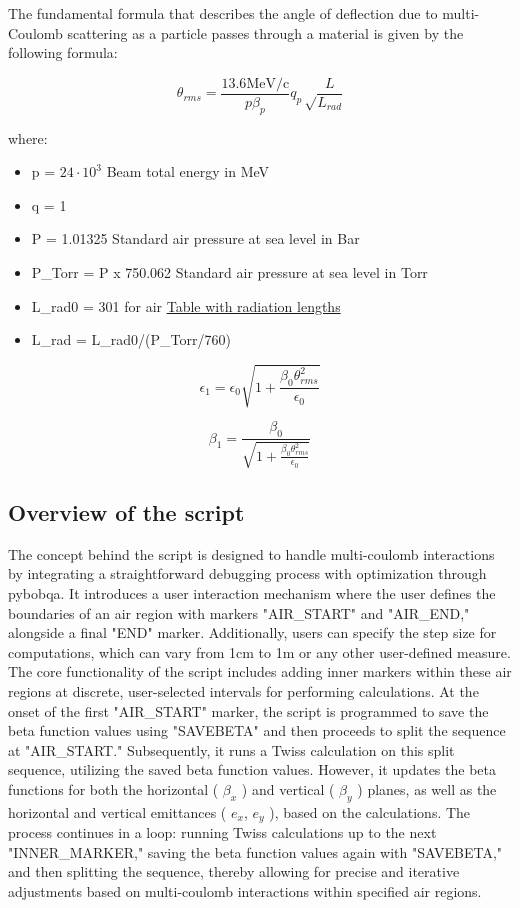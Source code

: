\documentclass[a4paper,
               biblatex,     %
               ]{jacow}
\begin{document}
The fundamental formula that describes the angle of deflection due to multi-Coulomb scattering as a particle passes through a material is given by the following formula:

\[
\theta_{rms} = \frac{13.6 \text{MeV/c}}{p\beta_{p}}q_{p}\sqrt\frac{L}{L_{rad}}\]

where:
\begin{itemize}
\item p = $24\cdot 10^{3}$ Beam total energy in MeV
\item q = 1
\item P = 1.01325  Standard air pressure at sea level in Bar
\item P\_Torr = P x 750.062 Standard air pressure at sea level in Torr
\item L\_rad0 = 301 for air \href{https://cds.cern.ch/record/941314/files/p245.pdf}{Table with radiation lengths}
\item L\_rad = L\_rad0/(P\_Torr/760)
\end{itemize}

\[
\epsilon_{1} = \epsilon_{0}\sqrt{1+\frac{\beta_{0}\theta_{rms}^{2}}{\epsilon_{0}}}
\]

\[
\beta_{1}=\frac{\beta_{0}}{\sqrt{1+\frac{\beta_{0}\theta_{rms}^{2}}{\epsilon_{0}}}}
\]


\subsection{Overview of the script}

The concept behind the script is designed to handle multi-coulomb interactions by integrating a straightforward debugging process with optimization through pybobqa. It introduces a user interaction mechanism where the user defines the boundaries of an air region with markers "AIR\_START" and "AIR\_END," alongside a final "END" marker. Additionally, users can specify the step size for computations, which can vary from 1cm to 1m or any other user-defined measure. The core functionality of the script includes adding inner markers within these air regions at discrete, user-selected intervals for performing calculations. At the onset of the first "AIR\_START" marker, the script is programmed to save the beta function values using "SAVEBETA" and then proceeds to split the sequence at "AIR\_START." Subsequently, it runs a Twiss calculation on this split sequence, utilizing the saved beta function values. However, it updates the beta functions for both the horizontal ( $\beta_{x}$ ) and vertical ( $\beta_{y}$ ) planes, as well as the horizontal and vertical emittances ( $e_{x}$, $e_{y}$ ), based on the calculations. The process continues in a loop: running Twiss calculations up to the next "INNER\_MARKER," saving the beta function values again with "SAVEBETA," and then splitting the sequence, thereby allowing for precise and iterative adjustments based on multi-coulomb interactions within specified air regions.
\end{document}
